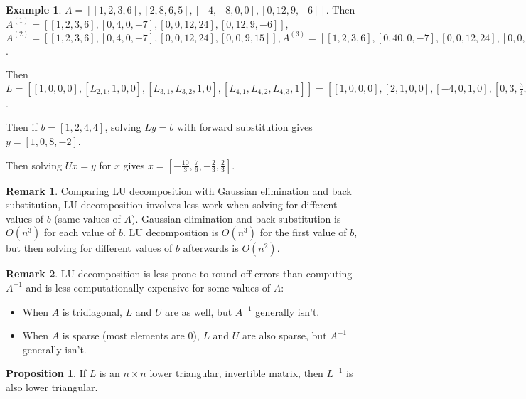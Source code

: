 \documentclass[12pt,a4paper]{article}
\theoremstyle{definition}
\newtheorem{proposition}[definition]{Proposition}
\newtheorem{example}[definition]{Example}
\newtheorem*{remark}{Remark}
\begin{document}
\begin{example}
	$A = [[1, 2, 3, 6], [2, 8, 6, 5], [-4, -8, 0, 0], [0, 12, 9, -6]]$. Then $A^{(1)} = [[1, 2, 3, 6], [0, 4, 0, -7], [0, 0, 12, 24], [0, 12, 9, -6]]$, $A^{(2)} = [[1, 2, 3, 6], [0, 4, 0, -7], [0, 0, 12, 24], [0, 0, 9, 15]], A^{(3)} = [[1, 2, 3, 6], [0, 40, 0, -7], [0, 0, 12, 24], [0, 0, 0, -3]]$.

	Then $L = [[1, 0, 0, 0], [L_{2, 1}, 1, 0, 0], [L_{3, 1}, L_{3, 2}, 1, 0], [L_{4, 1}, L_{4, 2}, L_{4, 3}, 1]] = [[1, 0, 0, 0], [2, 1, 0, 0], [-4, 0, 1, 0], [0, 3, \frac{3}{4}, 1]]$.

	Then if $b = [1, 2, 4, 4]$, solving $Ly = b$ with forward substitution gives $y = [1, 0, 8, -2]$.

	Then solving $Ux = y$ for $x$ gives $x = [-\frac{10}{3}, \frac{7}{6}, -\frac{2}{3}, \frac{2}{3}]$.
\end{example}

\begin{remark}
	Comparing LU decomposition with Gaussian elimination and back substitution, LU decomposition involves less work when solving for different values of $b$ (same values of $A$). Gaussian elimination and back substitution is $O(n^3)$ for each value of $b$. LU decomposition is $O(n^3)$ for the first value of $b$, but then solving for different values of $b$ afterwards is $O(n^2)$.
\end{remark}

\begin{remark}
	LU decomposition is less prone to round off errors than computing $A^{-1}$ and is less computationally expensive for some values of $A$:
	\begin{itemize}
		\item When $A$ is tridiagonal, $L$ and $U$ are as well, but $A^{-1}$ generally isn't.
		\item When $A$ is sparse (most elements are $0$), $L$ and $U$ are also sparse, but $A^{-1}$ generally isn't.
	\end{itemize}
\end{remark}

\begin{proposition}
	If $L$ is an $n \times n$ lower triangular, invertible matrix, then $L^{-1}$ is also lower triangular.
\end{proposition}
\end{document}

